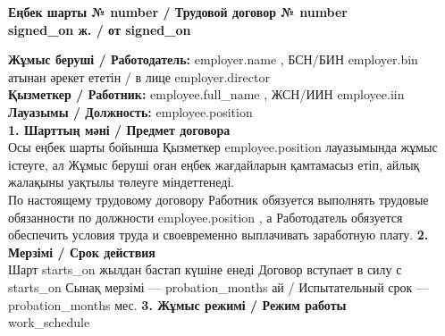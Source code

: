 \documentclass[a4paper,10pt]{article}
\newcommand{\field}[1]{\textbf{#1}}
\begin{document}
\begin{center}\Large\bfseries Еңбек шарты № {{ number }} / Трудовой договор № {{ number }}\\
\normalsize {{ signed_on }} ж. / от {{ signed_on }}\end{center}
\vspace{4mm}
\noindent\field{Жұмыс беруші / Работодатель:} {{ employer.name }}, БСН/БИН {{ employer.bin }}\\
{%
\noindent атынан әрекет ететін / в лице {{ employer.director }}\\
\vspace{2mm}
\noindent\field{Қызметкер / Работник:} {{ employee.full_name }}, ЖСН/ИИН {{ employee.iin }}\\
{%
\noindent\field{Лауазымы / Должность:} {{ employee.position }}\\
\vspace{4mm}
\noindent\field{1. Шарттың мәні / Предмет договора}\\
Осы еңбек шарты бойынша Қызметкер {{ employee.position }} лауазымында жұмыс істеуге, ал Жұмыс беруші оған еңбек жағдайларын қамтамасыз етіп, айлық жалақыны уақтылы төлеуге міндеттенеді.\\
По настоящему трудовому договору Работник обязуется выполнять трудовые обязанности по должности {{ employee.position }}, а Работодатель обязуется обеспечить условия труда и своевременно выплачивать заработную плату.
\vspace{2mm}
\noindent\field{2. Мерзімі / Срок действия}\\
Шарт {{ starts_on }} жылдан бастап күшіне енеді {%
Договор вступает в силу с {{ starts_on }} {%
{%
Сынақ мерзімі — {{ probation_months }} ай / Испытательный срок — {{ probation_months }} мес.
{%
\vspace{2mm}
\noindent\field{3. Жұмыс режимі / Режим работы}\\
{{ work_schedule }}
\vspace{2mm}
}}}}}}
\end{document}
